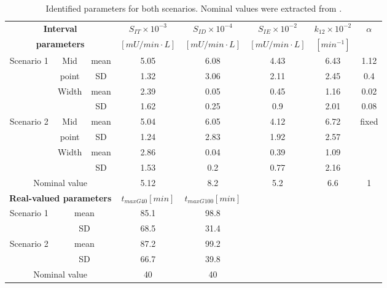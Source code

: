 \begin{sidewaystable}[hbtp]
	\centering
	\begin{tabular}{| c | c | c | c | c | c | c | c |}
	
	\cline{4-8}
	\multicolumn{3}{c|}{\textbf{Interval}} & $S_{IT} \times 10^{-3}$ & $S_{ID} \times 10^{-4}$ & $S_{IE} \times 10^{-2}$ & $k_{12} \times 10^{-2}$ & \multirow{2}{*}{$\alpha$} \\
	\multicolumn{3}{c|}{\textbf{parameters}} & $\left[mU/min\cdot L\right]$ & $\left[mU/min\cdot L\right]$ & $\left[mU/min\cdot L\right]$ & $\left[min^{-1}\right]$ & \\
	\hline
	\multirow{4}{*}{Scenario 1} & Mid & mean & 5.05 & 6.08 & 4.43 & 6.43 & 1.12 \\
	& point & SD & 1.32 & 3.06 & 2.11 & 2.45 & 0.4 \\
	\cline{2-8}
	& \multirow{2}{*}{Width} & mean & 2.39 & 0.05 & 0.45 & 1.16 & 0.02 \\
	& & SD & 1.62 & 0.25 & 0.9 & 2.01 & 0.08 \\
	\hline
	\multirow{4}{*}{Scenario 2} & Mid & mean & 5.04 & 6.05 & 4.12 & 6.72 & \multirow{4}{*}{fixed} \\
	& point & SD & 1.24 & 2.83 & 1.92 & 2.57 & \\
	\cline{2-7}
	& \multirow{2}{*}{Width} & mean & 2.86 & 0.04 & 0.39 & 1.09 & \\
	& & SD & 1.53 & 0.2 & 0.77 & 2.16 & \\
	\hline
	\multicolumn{3}{|c|}{Nominal value} & 5.12 & 8.2 & 5.2 & 6.6 & 1 \\
	\hline
	\hline
  \multicolumn{3}{|c|}{\textbf{Real-valued parameters}} & $t_{maxG40} [min]$ & $t_{maxG100} [min]$ & \multicolumn{1}{c}{} & \multicolumn{1}{c}{} & \multicolumn{1}{c}{} \\
	\cline{1-5}
	\multirow{2}{*}{Scenario 1} & \multicolumn{2}{c|}{mean} & 85.1 & 98.8 & \multicolumn{1}{c}{} & \multicolumn{1}{c}{} & \multicolumn{1}{c}{} \\
	 & \multicolumn{2}{|c|}{SD} & 68.5 & 31.4 & \multicolumn{1}{c}{} & \multicolumn{1}{c}{} & \multicolumn{1}{c}{} \\
	\cline{1-5}
	\multirow{2}{*}{Scenario 2} & \multicolumn{2}{c|}{mean} & 87.2 & 99.2 & \multicolumn{1}{c}{} & \multicolumn{1}{c}{} & \multicolumn{1}{c}{} \\
	 & \multicolumn{2}{|c|}{SD} & 66.7 & 39.8 & \multicolumn{1}{c}{} & \multicolumn{1}{c}{} & \multicolumn{1}{c}{} \\
	\cline{1-5} 
	\multicolumn{3}{|c|}{Nominal value} & 40 & 40 & \multicolumn{1}{c}{} & \multicolumn{1}{c}{} & \multicolumn{1}{c}{} \\
	\cline{1-5} 
	\end{tabular}
	
\caption{Identified parameters for both scenarios. Nominal values were extracted from \cite{hovorka2004nonlinear}.}
\label{tab:identifiedparam}
\end{sidewaystable}

